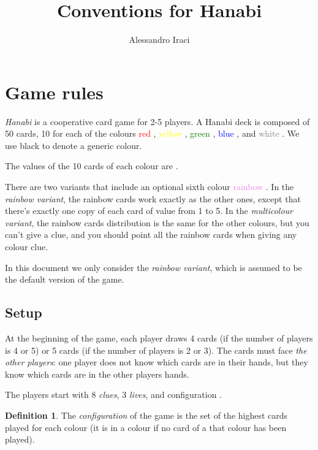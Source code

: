 \documentclass[a4paper]{article}
\title{Conventions for Hanabi}
\author{Alessandro Iraci}
\theoremstyle{plain}
\theoremstyle{definition}
\newtheorem{definition}[theorem]{Definition}
\begin{document}
	
\maketitle

\section{Game rules}

\textit{Hanabi} is a cooperative card game for 2-5 players. A Hanabi deck is composed of 50 cards, 10 for each of the colours \textcolor{red}{red} \red, \textcolor{yellow}{yellow} \yellow, \textcolor{green}{green} \green, \textcolor{blue}{blue} \blue, and \textcolor{gray}{white} \white. We use black to denote a generic colour.

The values of the 10 cards of each colour are          .

There are two variants that include an optional sixth colour \textcolor{violet}{rainbow} \rainbow. In the \textit{rainbow variant}, the rainbow cards work exactly as the other ones, except that there's exactly one copy of each card of value from 1 to 5. In the \textit{multicolour variant}, the rainbow cards distribution is the same for the other colours, but you can't give a  clue, and you should point all the rainbow cards when giving any colour clue.

In this document we only consider the \textit{rainbow variant}, which is assumed to be the default version of the game.


\subsection{Setup}

At the beginning of the game, each player draws 4 cards (if the number of players is 4 or 5) or 5 cards (if the number of players is 2 or 3). The cards must face \textit{the other players}: one player does not know which cards are in their hands, but they know which cards are in the other players hands.

The players start with 8 \textit{clues}, 3 \textit{lives}, and configuration      .

\begin{definition}
	The \textit{configuration} of the game is the set of the highest cards played for each colour (it is  in a colour if no card of a that colour has been played).
\end{definition}
\end{document}

